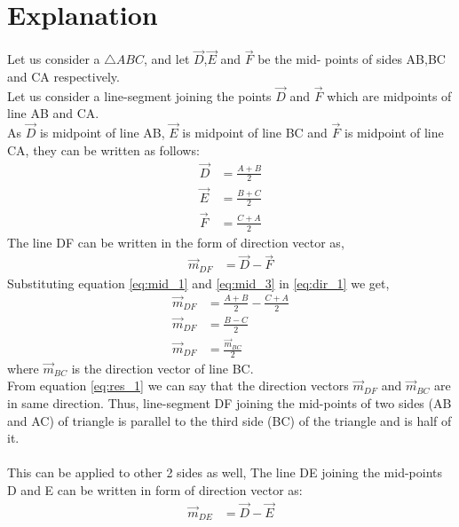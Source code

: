 \documentclass[journal,12pt,twocolumn]{IEEEtran}
\begin{document}
\section{Explanation}
Let us consider a $\triangle{ABC}$, and let $\vec{D}$,$\vec{E}$ and $\vec{F}$ be the mid- points of sides AB,BC and CA respectively.\\
Let us consider a line-segment joining the points $\vec{D}$ and $\vec{F}$ which are midpoints of line AB and CA.\\
As $\vec{D}$ is midpoint of line AB, $\vec{E}$ is midpoint of line BC and $\vec{F}$ is midpoint of line CA, they can be written as follows:
\begin{align}
    \vec{D}&=\frac{A+B}{2} \label{eq:mid_1}\\
    \vec{E}&=\frac{B+C}{2} \label{eq:mid_2}\\
    \vec{F}&=\frac{C+A}{2} \label{eq:mid_3}
\end{align}
The line DF can be written in the form of direction vector as,
\begin{align}
    \vec{m}_{DF}&=\vec{D}-\vec{F} \label{eq:dir_1}
\end{align}
Substituting equation \eqref{eq:mid_1} and \eqref{eq:mid_3} in \eqref{eq:dir_1} we get,
\begin{align}
    \vec{m}_{DF}&=\frac{A+B}{2}-\frac{C+A}{2}\\
    \vec{m}_{DF}&=\frac{B-C}{2} \\
    \vec{m}_{DF}&=\frac{\vec{m}_{BC}}{2} \label{eq:res_1}
\end{align}
where $\vec{m}_{BC}$ is the direction vector of line BC.\\
From equation \eqref{eq:res_1} we can say that the direction vectors $\vec{m}_{DF}$ and $\vec{m}_{BC}$ are in same direction. Thus, line-segment DF joining the mid-points of two sides (AB and AC) of triangle is parallel to the third side (BC) of the triangle and is half of it.\\
\\
This can be applied to other 2 sides as well,
The line DE joining the mid-points D and E can be written in form of direction vector as:
\begin{align}
    \vec{m}_{DE}&=\vec{D}-\vec{E} \label{eq:dir_2}
\end{align}
\end{document}
